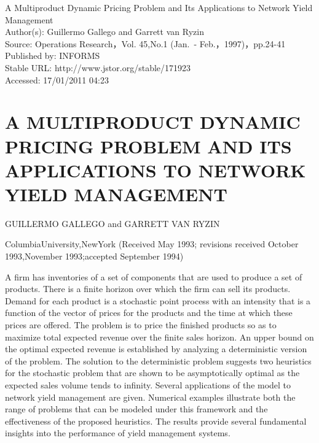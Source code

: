 

A Multiproduct Dynamic Pricing Problem and Its Applications to Network
Yield Management\\
Author(s): Guillermo Gallego and Garrett van Ryzin\\
Source: Operations Research，Vol. 45,No.1 (Jan.~-
Feb.，1997)，pp.24-41\\
Published by: INFORMS\\
Stable URL: http://www.jstor.org/stable/171923\\
Accessed: 17/01/2011 04:23

\section{A MULTIPRODUCT DYNAMIC PRICING PROBLEM AND ITS APPLICATIONS TO
NETWORK YIELD
MANAGEMENT}\label{a-multiproduct-dynamic-pricing-problem-and-its-applications-to-network-yield-management}

GUILLERMO GALLEGO and GARRETT VAN RYZIN

ColumbiaUniversity,NewYork (Received May 1993; revisions received
October 1993,November 1993;accepted September 1994)

A firm has inventories of a set of components that are used to produce a set of products. There is a finite horizon over which the firm can sell its products. Demand for each product is a stochastic point process with an intensity that is a function of the vector of prices for the products and the time at which these prices are offered. The problem is to price the finished products so as to maximize total expected revenue over the finite sales horizon. An upper bound on the optimal expected revenue is established by analyzing a deterministic version of the problem. The solution to the deterministic problem suggests two heuristics for the stochastic problem that are shown to be asymptotically optimal as the expected sales volume tends to infinity. Several applications of the model to network yield management are given. Numerical examples illustrate both the range of problems that can be modeled under this framework and the effectiveness of the proposed heuristics. The results provide several fundamental insights into the performance of yield management systems.

